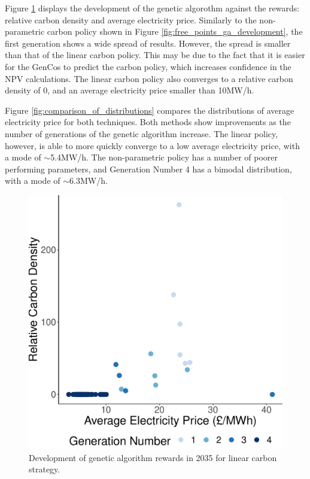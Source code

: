 \documentclass[sigconf]{acmart}
\begin{document}
Figure \ref{fig:linear_ga_development} displays the development of the genetic algorothm against the rewards: relative carbon density and average electricity price. Similarly to the non-parametric carbon policy shown in Figure \ref{fig:free_points_ga_development}, the first generation shows a wide spread of results. However, the spread is smaller than that of the linear carbon policy. This may be due to the fact that it is easier for the GenCos to predict the carbon policy, which increases confidence in the NPV calculations. The linear carbon policy also converges to a relative carbon density of 0, and an average electricity price smaller than \textsterling10MW/h.

Figure \ref{fig:comparison_of_distributions} compares the distributions of average electricity price for both techniques. Both methods show improvements as the number of generations of the genetic algorithm increase.  The linear policy, however, is able to more quickly converge to a low average electricity price, with a mode of ${\sim}$\textsterling5.4MW/h. The non-parametric policy has a number of poorer performing parameters, and Generation Number 4 has a bimodal distribution, with a mode of ${\sim}$\textsterling6.3MW/h.

\begin{figure}
\centering
\includegraphics[width=0.70\linewidth]{figures/results/linear_ga_development.pdf}
\caption{Development of genetic algorithm rewards in 2035 for linear carbon strategy.}
\label{fig:linear_ga_development}
\end{figure}


\end{document}
